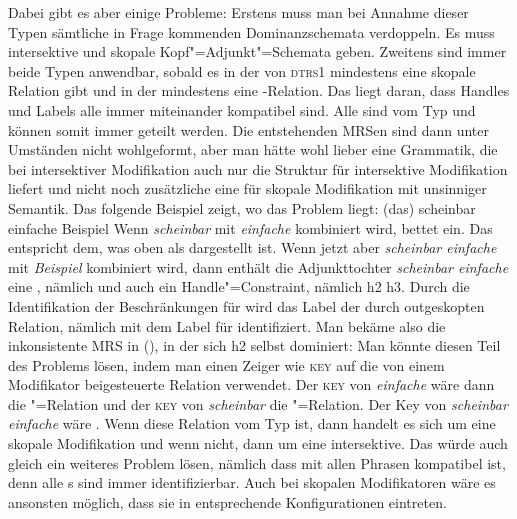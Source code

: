 Dabei gibt es aber einige Probleme: Erstens muss man bei Annahme dieser Typen sämtliche
in Frage kommenden Dominanzschemata verdoppeln. Es muss intersektive und skopale
Kopf"=Adjunkt"=Schemata geben. Zweitens sind immer beide Typen anwendbar, sobald es in der \relsl
von \textsc{dtrs1} mindestens eine skopale Relation gibt und in der \hconsl mindestens eine
\qeq-Relation. Das liegt daran, dass Handles und Labels alle immer miteinander kompatibel sind. Alle
sind vom Typ  und können somit immer geteilt werden. Die
entstehenden MRSen sind dann unter Umständen nicht wohlgeformt, aber man hätte wohl lieber eine
Grammatik, die bei intersektiver Modifikation auch nur die Struktur für intersektive Modifikation
liefert und nicht noch zusätzliche eine für skopale Modifikation mit unsinniger Semantik. Das
folgende Beispiel zeigt, wo das Problem liegt:
\eal
\ex (das) scheinbar einfache Beispiel
\ex {}
\zl
Wenn \emph{scheinbar} mit \emph{einfache} kombiniert wird, bettet 
 ein. Das entspricht dem, was oben als  dargestellt ist. Wenn
jetzt aber \emph{scheinbar einfache} mit \emph{Beispiel} kombiniert wird, dann enthält die
Adjunkttochter \emph{scheinbar einfache} eine , nämlich  und
auch ein Handle"=Constraint, nämlich h2 \qeq h3. Durch die Identifikation der Beschränkungen für
 wird das Label der durch  outgeskopten Relation, nämlich
 mit dem Label für  identifiziert. Man bekäme also die
inkonsistente MRS in (), in der sich h2 selbst dominiert:
\ea
{}
\z
Man könnte diesen Teil des Problems lösen, indem man einen Zeiger wie
\textsc{key} auf die von einem Modifikator beigesteuerte Relation verwendet. Der \textsc{key} von \emph{einfache} wäre
dann die "=Relation und der \textsc{key} von \emph{scheinbar} die
"=Relation. Der Key von \emph{scheinbar einfache} wäre . Wenn diese Relation vom Typ  ist, dann handelt es
sich um eine skopale Modifikation und wenn nicht, dann um eine intersektive. Das würde auch gleich
ein weiteres Problem lösen, nämlich dass  mit allen Phrasen kompatibel
ist, denn alle \ltop{}s sind immer identifizierbar. Auch bei skopalen Modifikatoren wäre es
ansonsten möglich, dass sie in entsprechende Konfigurationen eintreten. 
\largerpage

